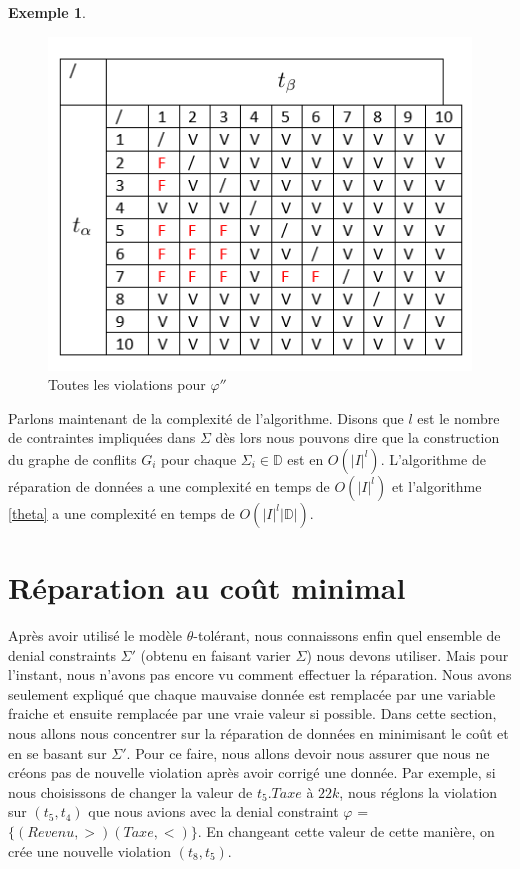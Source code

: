 \documentclass[letterpaper, 12pt]{report}
\theoremstyle{definition}
\newtheorem{myexample}{Exemple}
\begin{document}
\begin{myexample}
\begin{figure}
\centering
\includegraphics[scale=1]{img/TaxEqual}
\caption{\label{EqualTax} Toutes les violations pour $\varphi''$}
\end{figure}

\end{myexample}

Parlons maintenant de la complexité de l'algorithme. Disons que $l$ est le nombre de contraintes impliquées dans $\Sigma$ dès lors nous pouvons dire que la construction du graphe de conflits $G_i$ pour chaque $\Sigma_i \in \mathbb{D}$ est en $O(|I|^l)$. L'algorithme de réparation de données a une complexité en temps de $O(|I|^l)$ et l'algorithme \ref{theta} a une complexité en temps de $O(|I|^l|\mathbb{D}|)$. 

\section{Réparation au coût minimal}

Après avoir utilisé le modèle $\theta$-tolérant, nous connaissons enfin quel ensemble de denial constraints $\Sigma'$ (obtenu en faisant varier $\Sigma$) nous devons utiliser. Mais pour l'instant, nous n'avons pas encore vu comment effectuer la réparation. Nous avons seulement expliqué que chaque mauvaise donnée est remplacée par une variable fraiche et ensuite remplacée par une vraie valeur si possible. Dans cette section, nous allons nous concentrer sur la réparation de données en minimisant le coût et en se basant sur $\Sigma'$. Pour ce faire, nous allons devoir nous assurer que nous ne créons pas de nouvelle violation après avoir corrigé une donnée. Par exemple, si nous choisissons de changer la valeur de $t_5.Taxe$ à $22k$, nous réglons la violation sur $(t_5,t_4)$ que nous avions avec la denial constraint $\varphi$ = $\{ (Revenu,>)(Taxe,<)\} $. En changeant cette valeur de cette manière, on crée une nouvelle violation $(t_8,t_5)$.\\
\end{document}
